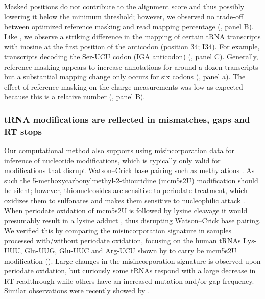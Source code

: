 \documentclass[9pt,lineno]{elife}
\begin{document}
Masked positions do not contribute to the alignment score and thus possibly lowering it below the minimum threshold; however, we observed no trade-off between optimized reference masking and read mapping percentage (, panel B).
Like \cite{Behrens2021-gb}, we observe a striking difference in the mapping of certain tRNA transcripts with inosine at the first position of the anticodon (position 34; I34).
For example, transcripts decoding the Ser-UCU codon (IGA anticodon) (, panel C).
Generally, reference masking appears to increase annotations for around a dozen transcripts but a substantial mapping change only occurs for six codons (, panel a).
The effect of reference masking on the charge measurements was low as expected because this is a relative number (, panel B).





\subsubsection{tRNA modifications are reflected in mismatches, gaps and RT stops}
Our computational method also supports using misincorporation data for inference of nucleotide modifications, which is typically only valid for modifications that disrupt Watson–Crick base pairing such as methylations \citep{Clark2016-ph, Behrens2021-gb}.
As such the 5-methoxycarbonylmethyl-2-thiouridine (mcm5s2U) modification should be silent; however, thionucleosides are sensitive to periodate treatment, which oxidizes them to sulfonates and makes them sensitive to nucleophilic attack \citep{Ziff1968-la, Rao1974-zq}.
When periodate oxidation of mcm5s2U is followed by lysine cleavage it would presumably result in a lysine adduct \citep{Ziff1968-la}, thus disrupting Watson–Crick base pairing.
We verified this by comparing the misincorporation signature in samples processed with/without periodate oxidation, focusing on the human tRNAs Lys-UUU, Gln-UUG, Glu-UUC and Arg-UCU shown by \cite{Lentini2018-xs} to carry be mcm5s2U modification ().
Large changes in the misincorporation signature is observed upon periodate oxidation, but curiously some tRNAs respond with a large decrease in RT readthrough while others have an increased mutation and/or gap frequency.
Similar observations were recently showed by \cite{Katanski2022-ij}.
\end{document}
